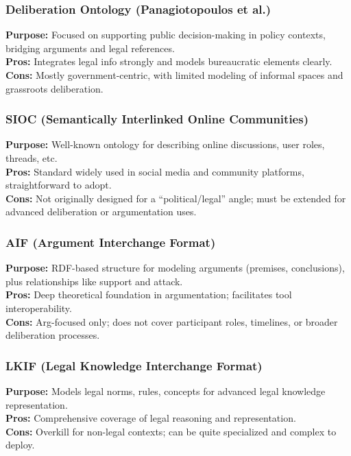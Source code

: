 \documentclass[11pt,a4paper]{article}
\begin{document}
\subsubsection{Deliberation Ontology (Panagiotopoulos et al.) \cite{PanagiotopoulosSamsElliman2011}}
\textbf{Purpose:} Focused on supporting public decision-making in policy contexts, bridging arguments and legal references.\\
\textbf{Pros:} Integrates legal info strongly and models bureaucratic elements clearly.\\
\textbf{Cons:} Mostly government-centric, with limited modeling of informal spaces and grassroots deliberation.

\subsubsection{SIOC (Semantically Interlinked Online Communities) \cite{SIOC2006}}
\textbf{Purpose:} Well-known ontology for describing online discussions, user roles, threads, etc.\\
\textbf{Pros:} Standard widely used in social media and community platforms, straightforward to adopt.\\
\textbf{Cons:} Not originally designed for a “political/legal” angle; must be extended for advanced deliberation or argumentation uses.

\subsubsection{AIF (Argument Interchange Format) \cite{Chesnevar2006}}
\textbf{Purpose:} RDF-based structure for modeling arguments (premises, conclusions), plus relationships like support and attack.\\
\textbf{Pros:} Deep theoretical foundation in argumentation; facilitates tool interoperability.\\
\textbf{Cons:} Arg-focused only; does not cover participant roles, timelines, or broader deliberation processes.

\subsubsection{LKIF (Legal Knowledge Interchange Format) \cite{Hoekstra2007}}
\textbf{Purpose:} Models legal norms, rules, concepts for advanced legal knowledge representation.\\
\textbf{Pros:} Comprehensive coverage of legal reasoning and representation.\\
\textbf{Cons:} Overkill for non-legal contexts; can be quite specialized and complex to deploy.
\end{document}
